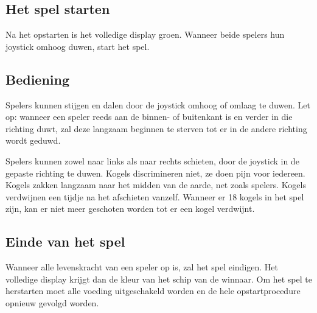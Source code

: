 \documentclass[a4paper]{article}
\begin{document}
\subsection{Het spel starten}
Na het opstarten is het volledige display groen. Wanneer beide spelers hun
joystick omhoog duwen, start het spel.

\subsection{Bediening}
Spelers kunnen stijgen en dalen door de joystick omhoog of omlaag te duwen. Let
op: wanneer een speler reeds aan de binnen- of buitenkant is en verder in die
richting duwt, zal deze langzaam beginnen te sterven tot er in de andere
richting wordt geduwd.

Spelers kunnen zowel naar links als naar rechts schieten, door de joystick in de
gepaste richting te duwen. Kogels discrimineren niet, ze doen pijn voor
iedereen. Kogels zakken langzaam naar het midden van de aarde, net zoals
spelers. Kogels verdwijnen een tijdje na het afschieten vanzelf. Wanneer er 18
kogels in het spel zijn, kan er niet meer geschoten worden tot er een kogel verdwijnt.

\subsection{Einde van het spel}
Wanneer alle levenskracht van een speler op is, zal het spel eindigen. Het
volledige display krijgt dan de kleur van het schip van de winnaar. Om het spel
te herstarten moet alle voeding uitgeschakeld worden en de hele opstartprocedure
opnieuw gevolgd worden.
\end{document}
